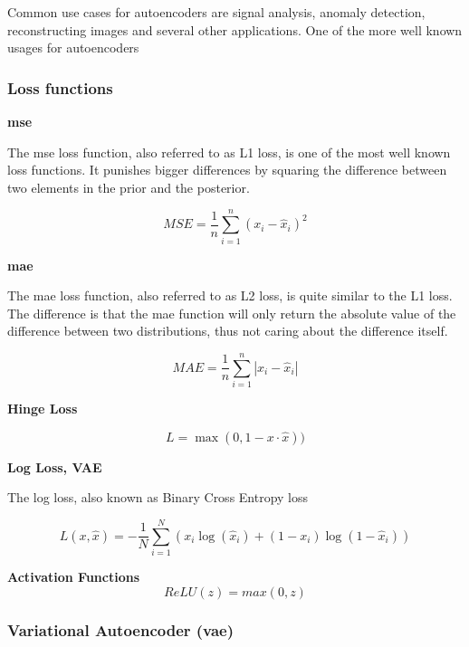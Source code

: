 Common use cases for autoencoders are signal analysis, anomaly detection, reconstructing images and several other applications. 
One of the more well known usages for autoencoders

\subsubsection{Loss functions}

\textbf{\acrfull{mse}}

The \acrshort{mse} loss function, also referred to as L1 loss, is one of the most well known loss functions. It punishes bigger differences by squaring the difference between two elements in the prior and the posterior.

\begin{equation}
    MSE = \dfrac{1}{n}  \sum_{i=1}^{n}(x_i-\hat{x}_i)^2
\end{equation}

\textbf{\acrfull{mae}}

The \acrshort{mae} loss function, also referred to as L2 loss, is quite similar to the L1 loss. The difference is that the \acrshort{mae} function will only return the absolute value of the difference between two distributions, thus not caring about the difference itself.

\begin{equation}
    MAE = \dfrac{1}{n}  \sum_{i=1}^{n}|x_i-\hat{x}_i|
\end{equation}

\textbf{Hinge Loss}

\begin{equation}
    L = \max(0, 1 - x \cdot \hat{x}))
\end{equation}

\textbf{Log Loss, VAE}

The log loss, also known as Binary Cross Entropy loss

\begin{equation}
L(x, \hat{x}) = - \frac{1}{N} \sum_{i=1}^{N} \left( x_i \log(\hat{x}_i) + (1 - x_i) \log(1 - \hat{x}_i) \right)
\end{equation}


\textbf{Activation Functions}
\begin{equation}
    ReLU(z) = max(0, z)
\end{equation}

\subsubsection{Variational Autoencoder (\acrshort{vae})}

